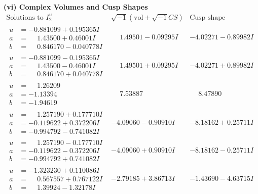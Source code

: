 \documentclass[1p]{elsarticle_modified}
\theoremstyle{definition}
\newcommand{\I}{\sqrt{-1}}
\begin{document}
\newpage\flushleft \textbf{(vi) Complex Volumes and Cusp Shapes}
$$\begin{array}{c|c|c}  
\text{Solutions to }I^u_{2}& \I (\text{vol} + \sqrt{-1}CS) & \text{Cusp shape}\\
 \hline 
\begin{aligned}
u &= -0.881099 + 0.195365 I \\
a &= \phantom{-}1.43500 + 0.46001 I \\
b &= \phantom{-}0.846170 - 0.040778 I\end{aligned}
 & \phantom{-}1.49501 - 0.09295 I & -4.02271 - 0.89982 I \\ \hline\begin{aligned}
u &= -0.881099 - 0.195365 I \\
a &= \phantom{-}1.43500 - 0.46001 I \\
b &= \phantom{-}0.846170 + 0.040778 I\end{aligned}
 & \phantom{-}1.49501 + 0.09295 I & -4.02271 + 0.89982 I \\ \hline\begin{aligned}
u &= \phantom{-}1.26209\phantom{ +0.000000I} \\
a &= -1.13394\phantom{ +0.000000I} \\
b &= -1.94619\phantom{ +0.000000I}\end{aligned}
 & \phantom{-}7.53887\phantom{ +0.000000I} & \phantom{-}8.47890\phantom{ +0.000000I} \\ \hline\begin{aligned}
u &= \phantom{-}1.257190 + 0.177710 I \\
a &= -0.119622 + 0.372206 I \\
b &= -0.994792 - 0.741082 I\end{aligned}
 & -4.09060 - 0.90910 I & -8.18162 + 0.25711 I \\ \hline\begin{aligned}
u &= \phantom{-}1.257190 - 0.177710 I \\
a &= -0.119622 - 0.372206 I \\
b &= -0.994792 + 0.741082 I\end{aligned}
 & -4.09060 + 0.90910 I & -8.18162 - 0.25711 I \\ \hline\begin{aligned}
u &= -1.323230 + 0.110086 I \\
a &= \phantom{-}0.567557 + 0.767122 I \\
b &= \phantom{-}1.39924 - 1.32178 I\end{aligned}
 & -2.79185 + 3.86713 I & -1.43690 - 4.63715 I \\ \hline\begin{aligned}

\end{aligned}
\end{array}$$
\end{document}
